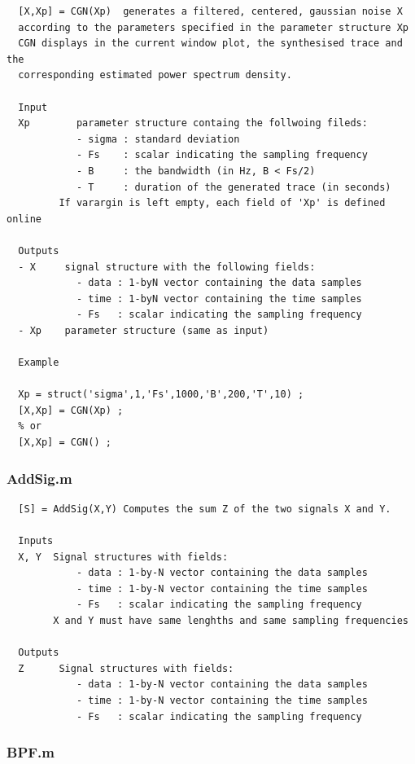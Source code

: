 \documentclass{article}
\begin{document}
        \color{lightgray} \begin{verbatim}  [X,Xp] = CGN(Xp)  generates a filtered, centered, gaussian noise X
  according to the parameters specified in the parameter structure Xp
  CGN displays in the current window plot, the synthesised trace and the
  corresponding estimated power spectrum density. 
 
  Input
  Xp        parameter structure containg the follwoing fileds:
            - sigma : standard deviation
            - Fs    : scalar indicating the sampling frequency
            - B     : the bandwidth (in Hz, B < Fs/2)
            - T     : duration of the generated trace (in seconds)
         If varargin is left empty, each field of 'Xp' is defined online
 
  Outputs
  - X     signal structure with the following fields:
            - data : 1-byN vector containing the data samples
            - time : 1-byN vector containing the time samples
            - Fs   : scalar indicating the sampling frequency
  - Xp    parameter structure (same as input)
 
  Example
 
  Xp = struct('sigma',1,'Fs',1000,'B',200,'T',10) ;
  [X,Xp] = CGN(Xp) ;
  % or 
  [X,Xp] = CGN() ;
\end{verbatim} \color{black}
    


\subsubsection{AddSig.m}

        \color{lightgray} \begin{verbatim}  [S] = AddSig(X,Y) Computes the sum Z of the two signals X and Y.
 
  Inputs
  X, Y  Signal structures with fields:
            - data : 1-by-N vector containing the data samples
            - time : 1-by-N vector containing the time samples
            - Fs   : scalar indicating the sampling frequency
        X and Y must have same lenghths and same sampling frequencies
 
  Outputs
  Z      Signal structures with fields:
            - data : 1-by-N vector containing the data samples
            - time : 1-by-N vector containing the time samples
            - Fs   : scalar indicating the sampling frequency
\end{verbatim} \color{black}

\subsubsection{BPF.m}
\end{document}
